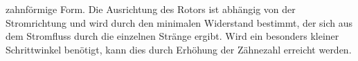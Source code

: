 zahnförmige Form. Die Ausrichtung des Rotors ist abhängig von der Stromrichtung und wird durch den minimalen Widerstand bestimmt, der sich aus dem Stromfluss durch die einzelnen Stränge ergibt. Wird ein besonders kleiner Schrittwinkel benötigt, kann dies durch Erhöhung der Zähnezahl erreicht werden. \cite{Schroder.2013} \cite{Hagl.2021} \cite{Babiel.2023}